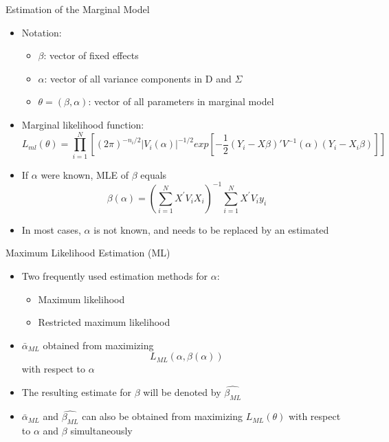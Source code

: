 \documentclass{beamer}
\begin{document}
\begin{frame}{Estimation of the Marginal Model}
\begin{itemize}
\item Notation:
\begin{itemize}
	\item $\beta$: vector of fixed effects 
	\item $\alpha$: vector of all variance components in D and $\Sigma$ 
    \item $\theta=(\beta, \alpha) $: vector of all parameters in marginal model
\end{itemize}
\item Marginal likelihood function:
\begin{equation*}
L_{ml}(\theta)=\prod_{i=1}^{N}\left[(2\pi)^{-n_i/2}|V_i(\alpha)|^{-1/2}exp\left[-\frac{1}{2}(Y_i-X\beta)'V^{-1}(\alpha)(Y_i-X_i\beta)\right]\right]
\end{equation*}
\item If $\alpha$ were known, MLE of $\beta$ equals
\[
\beta(\alpha)=\left(\sum_{i=1}^{N}X^{'}V_iX_i\right)^{-1}\sum_{i=1}^{N}X^{'}V_iy_i
\]
\item In most cases, $\alpha$ is not known, and needs to be replaced by an estimated
\end{itemize}
\end{frame}


\begin{frame}{Maximum Likelihood Estimation (ML)}
\begin{itemize}
	\item Two frequently used estimation methods for $\alpha$:
	\begin{itemize}
		\item Maximum likelihood
		\item Restricted maximum likelihood
	\end{itemize}
	\item ${\bar{\alpha}_{ML}}$ obtained from maximizing  
	\[L_{ML}(\alpha, \beta(\alpha))\] with respect to $\alpha$
	\item The resulting estimate for $\beta$ will be denoted by $\hat{\beta_{ML}}$
	\item ${\bar{\alpha}_{ML}}$ and $\hat{\beta_{ML}}$ can also be obtained from maximizing $L_{ML}(\theta)$ with respect to $\alpha$ and $\beta$ simultaneously
\end{itemize}
\end{frame}
\end{document}
